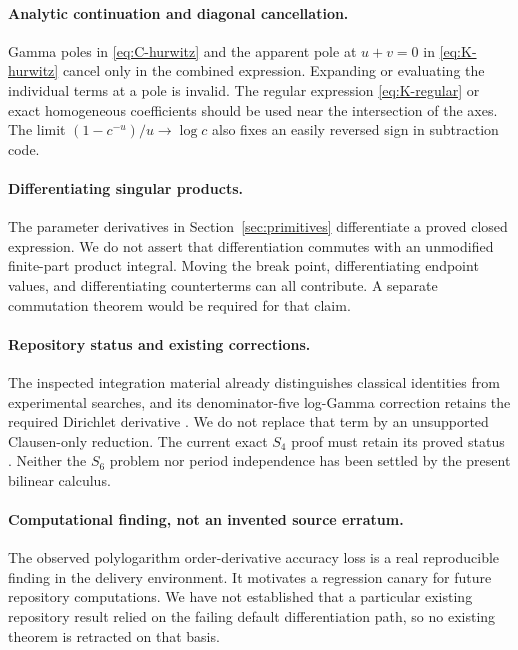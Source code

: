 \documentclass[11pt]{article}
\numberwithin{equation}{section}
\theoremstyle{definition}
\theoremstyle{remark}
\begin{document}
\paragraph{Analytic continuation and diagonal cancellation.}
Gamma poles in \eqref{eq:C-hurwitz} and the apparent pole at $u+v=0$
in \eqref{eq:K-hurwitz} cancel only in the combined expression.
Expanding or evaluating the individual terms at a pole is invalid.
The regular expression \eqref{eq:K-regular} or exact homogeneous
coefficients should be used near the intersection of the axes.
The limit $(1-c^{-u})/u\to\log c$ also fixes an easily reversed sign in
subtraction code.

\paragraph{Differentiating singular products.}
The parameter derivatives in Section~\ref{sec:primitives} differentiate
a proved closed expression. We do not assert that differentiation
commutes with an unmodified finite-part product integral. Moving the
break point, differentiating endpoint values, and differentiating
counterterms can all contribute. A separate commutation theorem would
be required for that claim.

\paragraph{Repository status and existing corrections.}
The inspected integration material already distinguishes classical
identities from experimental searches, and its denominator-five
log-Gamma correction retains the required Dirichlet derivative
\cite{repo-integration}. We do not replace that term by an unsupported
Clausen-only reduction. The current exact $S_4$ proof must retain its
proved status \cite{repo-s4}. Neither the $S_6$ problem nor period
independence has been settled by the present bilinear calculus.

\paragraph{Computational finding, not an invented source erratum.}
The observed polylogarithm order-derivative accuracy loss is a real
reproducible finding in the delivery environment. It motivates a
regression canary for future repository computations. We have not
established that a particular existing repository result relied on the
failing default differentiation path, so no existing theorem is
retracted on that basis.
\end{document}
